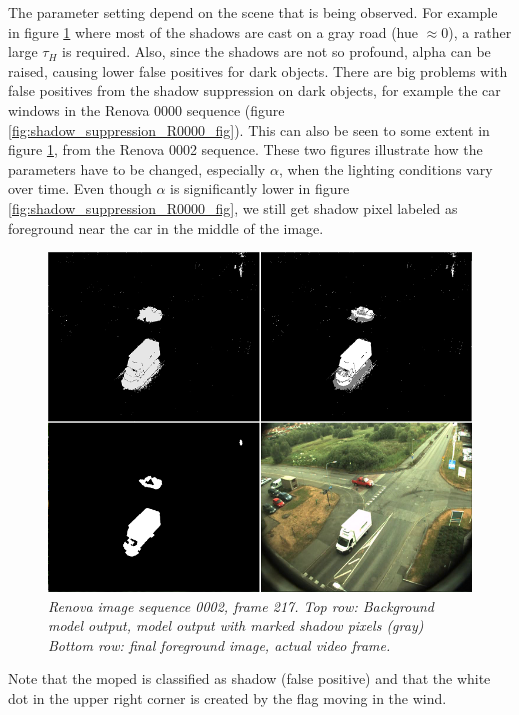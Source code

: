The parameter setting depend on the scene that is being observed. For example in figure \ref{fig:shadow_suppression_R0002_fig} where most of the shadows are cast on a gray road (hue $\approx 0$), a rather large $\tau_H$ is required. Also, since the shadows are not so profound, alpha can be raised, causing lower false positives for dark objects. There are big problems with false positives from the shadow suppression on dark objects, for example the car windows in the Renova 0000 sequence (figure \ref{fig:shadow_suppression_R0000_fig}). This can also be seen to some extent in figure \ref{fig:shadow_suppression_R0002_fig}, from the Renova 0002 sequence. These two figures illustrate how the parameters have to be changed, especially $\alpha$, when the lighting conditions vary over time. Even though $\alpha$ is significantly lower in figure \ref{fig:shadow_suppression_R0000_fig}, we still get shadow pixel labeled as foreground near the car in the middle of the image.

\newpage
\begin{figure}[h]
	\centering
	\includegraphics[width=\linewidth]{images/ShadowRenova0002.png}
	\caption{\textit{Renova image sequence 0002, frame 217. 
	\newline
	Top row: Background model output, model output with marked shadow pixels (gray) 
	\newline
	Bottom row: final foreground image, actual video frame.}}
	\label{fig:shadow_suppression_R0002_fig}  %
\end{figure}
Note that the moped is classified as shadow (false positive) and that the white dot in the upper right corner is created by the flag moving in the wind.\\


